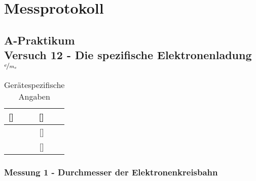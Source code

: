 \documentclass[11pt,a4paper,twoside]{article}
\begin{document}
\section*{Messprotokoll}
\subsection*{A-Praktikum \\ Versuch 12 - Die spezifische Elektronenladung $\nicefrac{e}{m_e}$}


\begin{table}[!ht]
  \caption*{Gerätespezifische Angaben}
  \begin{center}
  \begin{tabular}{| r | c | c || r | c | c |}
    \hline
    \hspace{0.6cm} [\hspace{1.0cm}] & \hspace{2.2cm} & \hspace{2.2cm} & \hspace{0.6cm} [\hspace{1.0cm}] & \hspace{2.2cm} & \hspace{2.2cm} \\
    \hline
     [\hspace{1.0cm}] & \hspace{2.2cm} & \hspace{2.2cm} & [\hspace{1.0cm}] & \hspace{2.2cm} & \hspace{2.2cm} \\
    \hline
     [\hspace{1.0cm}] & \hspace{2.2cm} & \hspace{2.2cm} & [\hspace{1.0cm}] & \hspace{2.2cm} & \hspace{2.2cm} \\
    \hline
  \end{tabular}
  \end{center}
\end{table}


\subsubsection*{Messung 1 - Durchmesser der Elektronenkreisbahn}
\end{document}
